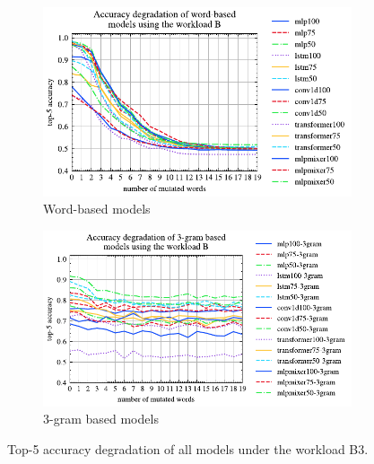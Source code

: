 \documentclass[conference]{IEEEtran}
\begin{document}
\begin{figure}[!th]
	\centering
	\begin{subfigure}[]{0.95\textwidth}
		\includegraphics[]{graphics/acc_degradation_word_based_B.pdf}
		\caption{Word-based models}
		\label{fig:acc_degradation_workload_B_word_based}
	\end{subfigure}
	\vfill
	\begin{subfigure}[]{0.95\textwidth}
		\includegraphics[]{graphics/acc_degradation_3gram_based_B.pdf}
		\caption{3-gram based models}
		\label{fig:acc_degradation_workload_B_3gram}
	\end{subfigure}
	\caption{Top-5 accuracy degradation of all models under the workload B3.}
	\label{fig:acc_degradation_workload_B_all}
\end{figure}
\end{document}
